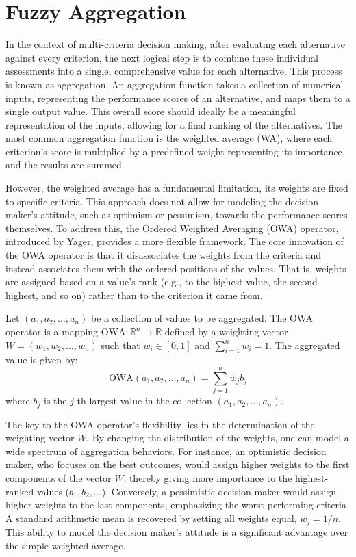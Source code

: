 \section{Fuzzy Aggregation}
\label{subsec:fuzzy_aggregation}

In the context of multi-criteria decision making, after evaluating each alternative against every criterion, the next logical step is to combine these individual assessments into a single, comprehensive value for each alternative. This process is known as aggregation. An aggregation function takes a collection of numerical inputs, representing the performance scores of an alternative, and maps them to a single output value. This overall score should ideally be a meaningful representation of the inputs, allowing for a final ranking of the alternatives. The most common aggregation function is the weighted average (WA), where each criterion's score is multiplied by a predefined weight representing its importance, and the results are summed.

However, the weighted average has a fundamental limitation, its weights are fixed to specific criteria. This approach does not allow for modeling the decision maker's attitude, such as optimism or pessimism, towards the performance scores themselves. To address this, the Ordered Weighted Averaging (OWA) operator, introduced by Yager, provides a more flexible framework. The core innovation of the OWA operator is that it disassociates the weights from the criteria and instead associates them with the ordered positions of the values. That is, weights are assigned based on a value's rank (e.g., to the highest value, the second highest, and so on) rather than to the criterion it came from.

\begin{definition}
Let $(a_1, a_2, \dots, a_n)$ be a collection of values to be aggregated. The OWA operator is a mapping $\text{OWA}: \mathbb{R}^n \to \mathbb{R}$ defined by a weighting vector $W = (w_1, w_2, \dots, w_n)$ such that $w_i \in [0, 1]$ and $\sum_{i=1}^{n} w_i = 1$. The aggregated value is given by:
\[
\text{OWA}(a_1, a_2, \dots, a_n) = \sum_{j=1}^{n} w_j b_j
\]
where $b_j$ is the $j$-th largest value in the collection $(a_1, a_2, \dots, a_n)$.
\end{definition}

The key to the OWA operator's flexibility lies in the determination of the weighting vector $W$. By changing the distribution of the weights, one can model a wide spectrum of aggregation behaviors. For instance, an optimistic decision maker, who focuses on the best outcomes, would assign higher weights to the first components of the vector $W$, thereby giving more importance to the highest-ranked values ($b_1, b_2, \dots$). Conversely, a pessimistic decision maker would assign higher weights to the last components, emphasizing the worst-performing criteria. A standard arithmetic mean is recovered by setting all weights equal, $w_j = 1/n$. This ability to model the decision maker's attitude is a significant advantage over the simple weighted average.

